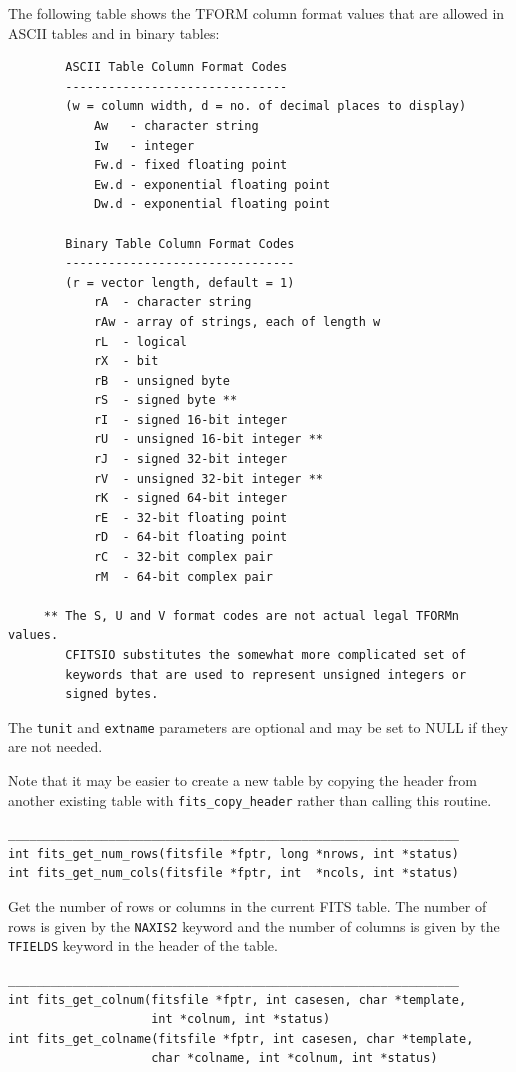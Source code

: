 \documentclass[11pt]{article}
\begin{document}
The following table
shows the TFORM column format values that are allowed in ASCII tables
and in binary tables:
\begin{verbatim}
        ASCII Table Column Format Codes
        -------------------------------
        (w = column width, d = no. of decimal places to display)
            Aw   - character string
            Iw   - integer
            Fw.d - fixed floating point
            Ew.d - exponential floating point
            Dw.d - exponential floating point

        Binary Table Column Format Codes
        --------------------------------
        (r = vector length, default = 1)
            rA  - character string
            rAw - array of strings, each of length w
            rL  - logical
            rX  - bit
            rB  - unsigned byte
            rS  - signed byte **
            rI  - signed 16-bit integer
            rU  - unsigned 16-bit integer **
            rJ  - signed 32-bit integer
            rV  - unsigned 32-bit integer **
            rK  - signed 64-bit integer
            rE  - 32-bit floating point
            rD  - 64-bit floating point
            rC  - 32-bit complex pair
            rM  - 64-bit complex pair

     ** The S, U and V format codes are not actual legal TFORMn values.
        CFITSIO substitutes the somewhat more complicated set of
        keywords that are used to represent unsigned integers or
        signed bytes.

\end{verbatim}

The {\tt tunit} and {\tt extname} parameters are optional and
may be set to NULL
if they are not needed.

Note that it may be easier to create a new table by copying the
header from another existing table with {\tt fits\_copy\_header} rather
than calling this routine.

\begin{verbatim}
_______________________________________________________________
int fits_get_num_rows(fitsfile *fptr, long *nrows, int *status)
int fits_get_num_cols(fitsfile *fptr, int  *ncols, int *status)
\end{verbatim}

Get the number of rows or columns in the current FITS table.  The
number of rows is given by the {\tt NAXIS2} keyword and the number of columns
is given by the {\tt TFIELDS} keyword in the header of the table.

\begin{verbatim}
_______________________________________________________________
int fits_get_colnum(fitsfile *fptr, int casesen, char *template,
                    int *colnum, int *status)
int fits_get_colname(fitsfile *fptr, int casesen, char *template,
                    char *colname, int *colnum, int *status)
\end{verbatim}
\end{document}
